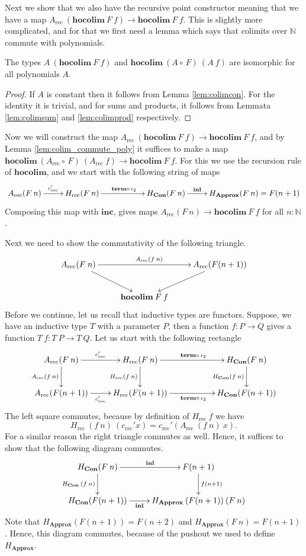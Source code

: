 \documentclass[a4paper,UKenglish]{lipics-v2016}
\newcommand{\Boperator}[1]{\mathrm{\mathbf{#1}}}
\newcommand{\comp}[0]{\circ \,}
\newcommand{\rec}[0]{\operatorname{rec}}
\newcommand{\term}[0]{\textbf{term}}
\newcommand{\Con}[0]{\textbf{Con}}
\newcommand{\Approx}[0]{\textbf{Approx}}
\newcommand{\hocolim}[0]{\Boperator{hocolim}}
\newcommand{\inl}[0]{\Boperator{inl}}
\newcommand{\inc}[0]{\Boperator{inc}}
\begin{document}
Next we show that we also have the recursive point constructor meaning that we have a map $A_{\rec} \> (\hocolim \> F \> f) \rightarrow \hocolim \> F \> f$.
This is slightly more complicated, and for that we first need a lemma which says that colimits over $\mathbb{N}$ commute with polynomials.

\begin{lemma}
\label{lem:colim_commute_poly}
The types $A \> (\hocolim \> F \> f)$ and $\hocolim \> (A \comp F) \> (A \> f)$ are isomorphic for all polynomials $A$.
\end{lemma}

\begin{proof}
If $A$ is constant then it follows from Lemma \ref{lem:colimcon}.
For the identity it is trivial, and for sums and products, it follows from Lemmata \ref{lem:colimsum} and \ref{lem:colimprod} respectively. 
\end{proof}

Now we will construct the map $A_{\rec} \> (\hocolim \> F \> f) \rightarrow \hocolim \> F \> f$, and by Lemma \ref{lem:colim_commute_poly} it suffices to make a map $\hocolim \> (A_{\rec} \comp F) \> (A_{\rec} \> f) \rightarrow \hocolim \> F \> f$.
For this we use the recursion rule of $\hocolim$, and we start with the following string of maps
\[
\xymatrix
{
		A_{\rec}(F \> n) \ar[r]^-{c_{\rec}'} 
		& H_{\rec}(F \> n) \ar[rr]^{\term \comp \iota_2} &
		& H_{\Con}(F \> n) \ar[r]^-{\inl}
		& H_{\Approx}(F \> n) = F(n + 1)
}
\]
Composing this map with $\inc$, gives maps $A_{\rec}(F \> n) \rightarrow \hocolim \> F \> f$ for all $n : \mathbb{N}$.

Next we need to show the commutativity of the following triangle.
\[
\xymatrix
{
	A_{\rec}(F \> n) \ar[rr]^{A_{\rec}(f \> n)} \ar[dr] & & A_{\rec}(F(n+1)) \ar[dl] \\
	& \hocolim \> F \> f &
}
\]
Before we continue, let us recall that inductive types are functors.
Suppose, we have an inductive type $T$ with a parameter $P$, then a function $f : P \rightarrow Q$ gives a function $T \> f : T \> P \rightarrow T \> Q$.
Let us start with the following rectangle
\[
\xymatrix
{
	A_{\rec}(F \> n) \ar[r]^-{c_{\rec}'} \ar[d]_{A_{\rec}(f \> n)} 
		& H_{\rec}(F \> n) \ar[rr]^{\term \comp \iota_2} \ar[d]_{H_{\rec}(f \> n)} &
		& H_{\Con}(F \> n) \ar[d]_{H_{\Con}(f \> n)}\\
	A_{\rec}(F(n+1)) \ar[r]_-{c_{\rec}'} 
		& H_{\rec}(F(n+1)) \ar[rr]_{\term \comp \iota_2} &
		& H_{\Con}(F(n+1))
}
\]
The left square commutes, because by definition of $H_{\rec} \> f$ we have
\[
H_{\rec} \>(f \> n) \> (c_{\rec}' x) = c_{\rec}' (A_{\rec} \> (f \> n) \> x).
\]
For a similar reason the right triangle commutes as well.
Hence, it suffices to show that the following diagram commutes.
\[
\xymatrix
{
	H_{\Con}(F \> n) \ar[d]_{H_{\Con} \> (f \> n)} \ar[r]^-{\inl}
		& F(n+1) \ar[d]^{f(n+1)}\\
	H_{\Con}(F(n+1)) \ar[r]_-{\inl}
		& H_{\Approx} \> (F(n+1)) \> (F \> n)
}
\]
Note that $H_{\Approx}(F(n+1)) = F(n+2)$ and $H_{\Approx}(F \> n) = F(n+1)$.
Hence, this diagram commutes, because of the pushout we used to define $H_{\Approx}$.
\end{document}
